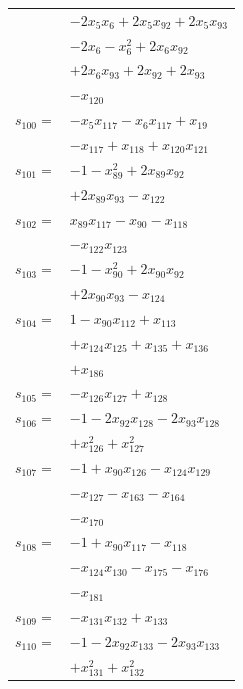 \begin{longtable}{@{}r@{\;}l@{}}
 & \(\displaystyle -2x_{5}x_{6} +2x_{5}x_{92} +2x_{5}x_{93}\) \\
 & \(\displaystyle -2x_{6} -x_{6}^{2} +2x_{6}x_{92}\) \\
 & \(\displaystyle +2x_{6}x_{93} +2x_{92} +2x_{93}\) \\
 & \(\displaystyle -x_{120}\) \\[3pt]
\(s_{100}=\) & \(\displaystyle -x_{5}x_{117} -x_{6}x_{117} +x_{19}\) \\
 & \(\displaystyle -x_{117} +x_{118} +x_{120}x_{121}\) \\[3pt]
\(s_{101}=\) & \(\displaystyle -1 -x_{89}^{2} +2x_{89}x_{92}\) \\
 & \(\displaystyle +2x_{89}x_{93} -x_{122}\) \\[3pt]
\(s_{102}=\) & \(\displaystyle x_{89}x_{117} -x_{90} -x_{118}\) \\
 & \(\displaystyle -x_{122}x_{123}\) \\[3pt]
\(s_{103}=\) & \(\displaystyle -1 -x_{90}^{2} +2x_{90}x_{92}\) \\
 & \(\displaystyle +2x_{90}x_{93} -x_{124}\) \\[3pt]
\(s_{104}=\) & \(\displaystyle 1 -x_{90}x_{112} +x_{113}\) \\
 & \(\displaystyle +x_{124}x_{125} +x_{135} +x_{136}\) \\
 & \(\displaystyle +x_{186}\) \\[3pt]
\(s_{105}=\) & \(\displaystyle -x_{126}x_{127} +x_{128}\) \\[3pt]
\(s_{106}=\) & \(\displaystyle -1 -2x_{92}x_{128} -2x_{93}x_{128}\) \\
 & \(\displaystyle +x_{126}^{2} +x_{127}^{2}\) \\[3pt]
\(s_{107}=\) & \(\displaystyle -1 +x_{90}x_{126} -x_{124}x_{129}\) \\
 & \(\displaystyle -x_{127} -x_{163} -x_{164}\) \\
 & \(\displaystyle -x_{170}\) \\[3pt]
\(s_{108}=\) & \(\displaystyle -1 +x_{90}x_{117} -x_{118}\) \\
 & \(\displaystyle -x_{124}x_{130} -x_{175} -x_{176}\) \\
 & \(\displaystyle -x_{181}\) \\[3pt]
\(s_{109}=\) & \(\displaystyle -x_{131}x_{132} +x_{133}\) \\[3pt]
\(s_{110}=\) & \(\displaystyle -1 -2x_{92}x_{133} -2x_{93}x_{133}\) \\
 & \(\displaystyle +x_{131}^{2} +x_{132}^{2}\) \\[3pt]

\end{longtable}
